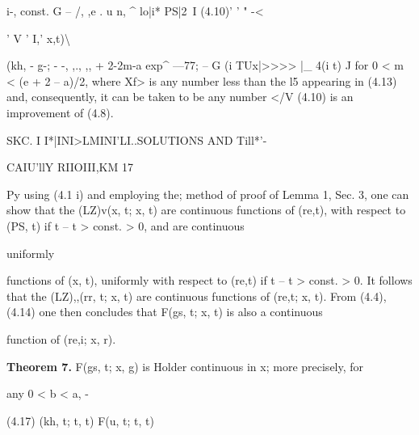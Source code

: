 \begin{ocrformula}
i-,                                         const.                             G       --
/, ,e             . u n, ^                                                                   lo|i*   PS|2~I
(4.10)'                ' " -<
\end{ocrformula}

' V ' I,' x,t)\textbackslash{}

\begin{ocrformula}
\Ph(kh,                          -        g-; - -, ,., ,,
+ 2-2m-a            exp^   ---77; --    G
(i            TU\Kh      x|>>>>                        |_ 4(i      t) J
for 0 < m < (e + 2 -- a)/2, where         Xf> is any number                                           less than        the     l5
appearing   in (4.13) and, consequently,    it can be taken                                        to be any         number
</V   (4.10) is an improvement    of (4.8).
\end{ocrformula}

\begin{ocrformula}
SKC. I               I*|INI>LMINI'LI..SOLUTIONS                     AND          Till*'-
\end{ocrformula}

CAIU'llY RIIOIII,KM 17

\begin{ocrformula}
Py using (4.1 i) and employing    the; method    of proof of Lemma   1, Sec. 3,
one can show   that the (LZ)v(x, t; x, t) are continuous       functions of (re,t),
with respect to (PS, t) if t --   t  >  const. > 0, and are continuous
\end{ocrformula}

uniformly

\begin{ocrformula}
functions of (x, t), uniformly   with respect to (re,t) if t -- t > const. > 0.
It follows  that the (LZ),,(rr, t; x, t) are continuous functions of (re,t; x, t).
From   (4.4), (4.14) one then concludes that F(gs, t; x, t) is also a continuous
\end{ocrformula}

function of (re,i; x, r).

\medskip\noindent\textbf{Theorem 7.} F(gs, t; x, g) is Holder continuous in x; more precisely, for

any 0 < b < a, -

\begin{ocrformula}
(4.17)        \Ph(kh, t; t, t)           F(u, t; t, t)\
\end{ocrformula}

